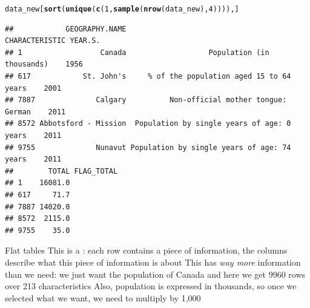 \documentclass[aspectratio=169]{beamer}\usepackage[]{graphicx}\usepackage[]{xcolor}
\makeatletter
\newcommand{\hlnum}[1]{\textcolor[rgb]{0.686,0.059,0.569}{#1}}%
\newcommand{\hlsng}[1]{\textcolor[rgb]{0.192,0.494,0.8}{#1}}%
\newcommand{\hlopt}[1]{\textcolor[rgb]{0,0,0}{#1}}%
\newcommand{\hldef}[1]{\textcolor[rgb]{0.345,0.345,0.345}{#1}}%
\newcommand{\hlkwb}[1]{\textcolor[rgb]{0.69,0.353,0.396}{#1}}%
\newcommand{\hlkwd}[1]{\textcolor[rgb]{0.737,0.353,0.396}{\textbf{#1}}}%
\newenvironment{kframe}{%
 \def\at@end@of@kframe{}%
 \ifinner\ifhmode%
  \def\at@end@of@kframe{\end{minipage}}%
  \begin{minipage}{\columnwidth}%
 \fi\fi%
 \def\FrameCommand##1{\hskip\@totalleftmargin \hskip-\fboxsep
 \colorbox{shadecolor}{##1}\hskip-\fboxsep
     \hskip-\linewidth \hskip-\@totalleftmargin \hskip\columnwidth}%
 \MakeFramed {\advance\hsize-\width
   \@totalleftmargin\z@ \linewidth\hsize
   \@setminipage}}%
 {\par\unskip\endMakeFramed%
 \at@end@of@kframe}
\newenvironment{knitrout}{}{} %
\makeatother
\begin{document}
\begin{frame}[fragile]
\begin{knitrout}
\color{fgcolor}\begin{kframe}
\begin{alltt}
\hldef{data_new[}\hlkwd{sort}\hldef{(}\hlkwd{unique}\hldef{(}\hlkwd{c}\hldef{(}\hlnum{1}\hldef{,}\hlkwd{sample}\hldef{(}\hlkwd{nrow}\hldef{(data_new),} \hlnum{4}\hldef{)))), ]}
\end{alltt}
\begin{verbatim}
##            GEOGRAPHY.NAME                              CHARACTERISTIC YEAR.S.
## 1                  Canada                   Population (in thousands)    1956
## 617            St. John's     % of the population aged 15 to 64 years    2001
## 7887              Calgary          Non-official mother tongue: German    2011
## 8572 Abbotsford - Mission  Population by single years of age: 0 years    2011
## 9755              Nunavut Population by single years of age: 74 years    2011
##        TOTAL FLAG_TOTAL
## 1    16081.0           
## 617     71.7           
## 7887 14020.0           
## 8572  2115.0           
## 9755    35.0
\end{verbatim}
\end{kframe}
\end{knitrout}
\end{frame}


\begin{frame}{Flat tables}
This is a : each row contains a piece of information, the columns describe what this piece of information is about
\vfill
This has \emph{way more} information than we need: we just want the population of Canada and here we get 9960 rows over 213 characteristics
\vfill
Also, population is expressed in thousands, so once we selected what we want, we need to multiply by 1,000
\end{frame}

\end{document}
